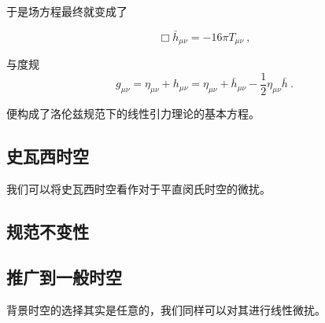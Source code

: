 于是场方程最终就变成了

\begin{equation}
\Box\bar{h}_{\mu\nu} = -16\pi T_{\mu\nu}~,
\end{equation}

与度规
\begin{equation}
g_{\mu\nu}= \eta_{\mu\nu} + h_{\mu\nu}=\eta_{\mu\nu} + \bar{h}_{\mu\nu} - \frac{1}{2}\eta_{\mu\nu} \bar{h}~.
\end{equation}

便构成了洛伦兹规范下的线性引力理论的基本方程。


\subsection{史瓦西时空}

我们可以将史瓦西时空看作对于平直闵氏时空的微扰。


\subsection{规范不变性}


\subsection{推广到一般时空}

背景时空的选择其实是任意的，我们同样可以对其进行线性微扰。

